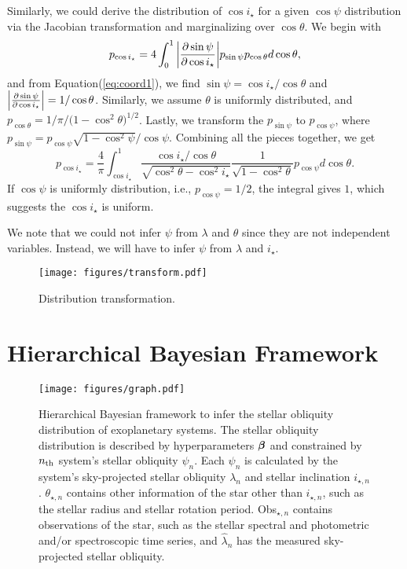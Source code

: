 \documentclass[twocolumn,times]{aastex631}
\begin{document}
Similarly, we could derive the distribution of $\cos{i_\star}$ for a given $\cos{\psi}$ distribution via the Jacobian transformation and marginalizing over $\cos{\theta}$. We begin with
\begin{equation}
    p_{\cos{i_\star}} = 4 \int_{0}^{1} \abs{\pdv{\sin{\psi}}{\cos{i_\star}}} p_{\sin{\psi}} p_{\cos{\theta}} d\cos{\theta},
\end{equation}
and from Equation(\ref{eq:coord1}), we find $\sin{\psi} = \cos{i_\star}/\cos{\theta}$ and $\abs{\pdv{\sin{\psi}}{\cos{i_\star}}} = 1/\cos{\theta}$. Similarly, we assume $\theta$ is uniformly distributed, and $p_{\cos{\theta}} = 1/\pi/(1-\cos^2{\theta)^{1/2}}$. Lastly, we transform the $p_{\sin{\psi}}$ to $p_{\cos{\psi}}$, where $p_{\sin{\psi}} = p_{\cos{\psi}}\sqrt{1-\cos^2{\psi}}/\cos{\psi}$. Combining all the pieces together, we get
\begin{equation}
    p_{\cos{i_\star}} = \frac{4}{\pi} \int_{\cos{i_\star}}^{1} \frac{\cos{i_\star}/\cos{\theta}}{\sqrt{\cos^2{\theta}-\cos^2{i_\star}}} \frac{1}{\sqrt{1-\cos^2{\theta}}} p_{\cos{\psi}} d\cos{\theta}.
\end{equation}
If $\cos{\psi}$ is uniformly distribution, i.e., $p_{\cos{\psi}} = 1/2$, the integral gives $1$, which suggests the $\cos{i_\star}$ is uniform.

We note that we could not infer $\psi$ from $\lambda$ and $\theta$ since they are not independent variables. Instead, we will have to infer $\psi$ from $\lambda$ and $i_\star$.

\begin{figure*}[ht!]
    \texttt{[image: figures/transform.pdf]}
    \caption{Distribution transformation.}
    \label{fig:transform}
\end{figure*}


\section{Hierarchical Bayesian Framework} \label{sec:hbm}

\begin{figure}[ht!]
    \texttt{[image: figures/graph.pdf]}
    \caption{Hierarchical Bayesian framework to infer the stellar obliquity distribution of exoplanetary systems. The stellar obliquity distribution is described by hyperparameters $\vb*{\beta}$ and constrained by $n_{\rm th}$ system's stellar obliquity $\psi_n$. Each $\psi_n$ is calculated by the system's sky-projected stellar obliquity $\lambda_n$ and stellar inclination $i_{\star, n}$. $\theta_{\star, n}$ contains other information of the star other than $i_{\star, n}$, such as the stellar radius and stellar rotation period. Obs$_{\star,n}$ contains observations of the star, such as the stellar spectral and photometric and/or spectroscopic time series, and $\hat{\lambda}_n$ has the measured sky-projected stellar obliquity.}
    \label{fig:graph}
\end{figure}
\end{document}
